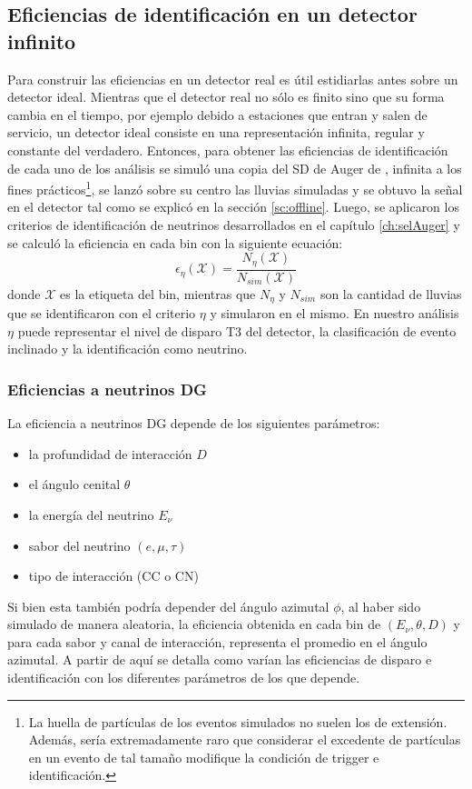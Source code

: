	\subsection{Eficiencias de identificación en un detector infinito}
	\label{sbsc:idealEff}
	
	Para construir las eficiencias en un detector real es útil estidiarlas antes sobre un detector ideal.
	Mientras que el detector real no s\'olo es finito sino que su forma cambia en el tiempo, por ejemplo debido a estaciones que entran y salen de servicio, un detector ideal consiste en una representación infinita, regular y constante del verdadero.
	Entonces, para obtener las eficiencias de identificación de cada uno de los análisis se simuló una copia del SD de Auger de , infinita a los fines prácticos\footnote{La huella de part\'iculas de los eventos simulados no suelen los  de extensión. Adem\'as, ser\'ia extremadamente raro que considerar el excedente de part\'iculas en un evento de tal tama\~no modifique la condici\'on de trigger e identificaci\'on.}, se lanzó sobre su centro las lluvias simuladas y se obtuvo la señal en el detector tal como se explicó en la sección \ref{sc:offline}.
	Luego, se aplicaron los criterios de identificación de neutrinos desarrollados en el capítulo \ref{ch:selAuger} y se calculó la eficiencia en cada bin con la siguiente ecuación:
	\begin{equation}
	 \epsilon_\eta(\mathcal{X})=\frac{N_{\eta}(\mathcal{X})}{N_{sim}(\mathcal{X})}
	 \label{eq:effDef}
	\end{equation}
	donde $\mathcal{X}$ es la etiqueta del bin, mientras que $N_{\eta}$ y $N_{sim}$ son la cantidad de lluvias que se identificaron con el criterio $\eta$ y simularon en el mismo. En nuestro análisis $\eta$ puede representar el nivel de disparo T3 del detector, la clasificación de  evento inclinado y la identificación como neutrino.
	
	\subsubsection{Eficiencias a neutrinos DG}
	
	La eficiencia a neutrinos DG depende de los siguientes parámetros:
	\begin{itemize}
	 \item la profundidad de interacción $D$
	 \item el ángulo cenital $\theta$
	 \item la energía del neutrino $E_\nu$
	 \item sabor del neutrino $(e,\mu,\tau)$
	 \item tipo de interacción (CC o CN)
	\end{itemize}
	Si bien esta también podría depender del ángulo azimutal $\phi$, al haber sido simulado de manera aleatoria, la eficiencia obtenida en cada bin de $(E_\nu,\theta,D)$ y para cada sabor y canal de interacción, representa el promedio en el ángulo azimutal.
	A partir de aqu\'i se detalla como var\'ian las eficiencias de disparo e identificaci\'on con los diferentes par\'ametros de los que depende.
	
